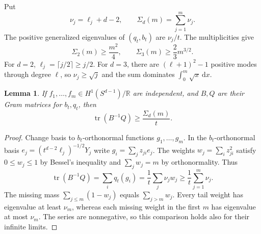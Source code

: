 \documentclass[11pt]{article}
\newtheorem{lemma}[theorem]{Lemma}
\theoremstyle{remark}
\newcommand{\R}{\mathbb R}
\newcommand{\Tr}{\operatorname{tr}}
\newcommand{\dd}{\,\mathrm d}
\begin{document}
Put
\begin{equation}\label{eq:sigma}
 \nu_j=\ell_j+d-2,\qquad \Sigma_d(m)=\sum_{j=1}^m\nu_j.
\end{equation}
The positive generalized eigenvalues of $(q_t,b_t)$ are $\nu_j/t$.
The multiplicities give
\begin{equation}\label{eq:counting}
 \Sigma_2(m)\ge\frac{m^2}{4},\qquad
 \Sigma_3(m)\ge\frac23m^{3/2}.
\end{equation}
For $d=2$, $\ell_j=\lceil j/2\rceil\ge j/2$. For $d=3$,
there are $(\ell+1)^2-1$ positive modes through degree $\ell$, so
$\nu_j\ge\sqrt j$ and the sum dominates $\int_0^m\sqrt x\dd x$.

\begin{lemma}\label{lem:boundarytrace}
If $f_1,\ldots,f_m\in H^1(S^{d-1})/\R$ are independent, and $B,Q$
are their Gram matrices for $b_t,q_t$, then
\[
 \Tr(B^{-1}Q)\ge\frac{\Sigma_d(m)}{t}.
\]
\end{lemma}
\begin{proof}
Change basis to $b_t$-orthonormal functions $g_1,\ldots,g_m$.
In the $b_t$-orthonormal basis
$e_j=(t^{d-2}\ell_j)^{-1/2}Y_j$ write $g_i=\sum_j z_{ji}e_j$.
The weights $w_j=\sum_i z_{ji}^2$ satisfy $0\le w_j\le1$ by Bessel's
inequality and $\sum_jw_j=m$ by orthonormality. Thus
\[
 \Tr(B^{-1}Q)=\sum_iq_t(g_i)=\frac1t\sum_j\nu_jw_j
       \ge\frac1t\sum_{j=1}^m\nu_j.
\]
The missing mass $\sum_{j\le m}(1-w_j)$ equals $\sum_{j>m}w_j$.
Every tail weight has eigenvalue at least $\nu_m$, whereas each missing
weight in the first $m$ has eigenvalue at most $\nu_m$. The series are
nonnegative, so this comparison holds also for their infinite limits.
\end{proof}
\end{document}
